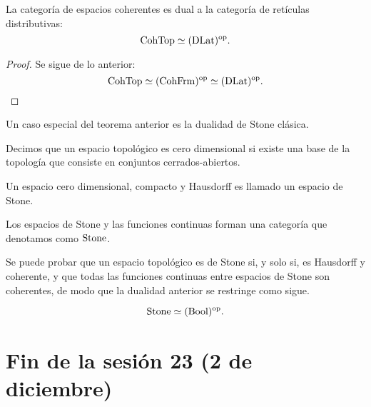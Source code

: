 \begin{thm}
    La categoría de espacios coherentes es dual
    a la categoría de retículas distributivas:
    \[
        \mathrm{CohTop} \simeq (\mathrm{DLat})^{\mathrm{op}}
    .\]
\end{thm}
\begin{proof}
    Se sigue de lo anterior:
    \[
        \mathrm{CohTop} \simeq (\mathrm{CohFrm})^{\mathrm{op}} \simeq (\mathrm{DLat})^{\mathrm{op}}
    .\]
\end{proof}

Un caso especial del teorema anterior es
la dualidad de Stone clásica.

\begin{defn}
    Decimos que un espacio topológico es cero dimensional
    si existe una base de la topología que consiste en
    conjuntos cerrados-abiertos.
    
    Un espacio cero dimensional, compacto y Hausdorff es llamado
    un espacio de Stone.
    
    Los espacios de Stone y las funciones continuas forman
    una categoría que denotamos como $\mathrm{Stone}$.
\end{defn}

Se puede probar que un espacio topológico es de Stone
si, y solo si, es Hausdorff y coherente,
y que todas las funciones continuas entre espacios de Stone
son coherentes, de modo que la dualidad anterior
se restringe como sigue.

\begin{thm}
    \[
        \mathrm{Stone} \simeq (\mathrm{Bool})^{\mathrm{op}}.
    \]
\end{thm}

\section*{Fin de la sesión 23 (2 de diciembre)}
